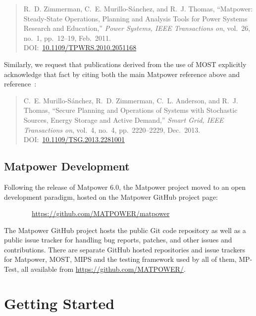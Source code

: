 \documentclass[12pt]{article}
\newcommand{\matpower}[0]{{\sc Matpower}}
\newcommand{\matpowergithuburl}[0]{https://github.com/MATPOWER/matpower}
\newcommand{\mptest}[0]{{MP-Test}}
\newcommand{\mips}[0]{{MIPS}}
\newcommand{\most}[0]{{MOST}}
\numberwithin{equation}{section}
\numberwithin{table}{section}
\numberwithin{figure}{section}
\begin{document}
\begin{quote}
\footnotesize
R.~D. Zimmerman, C.~E. Murillo-S{\'a}nchez, and R.~J. Thomas, ``\matpower{}: Steady-State Operations, Planning and Analysis Tools for Power Systems Research and Education,'' \emph{Power Systems, IEEE Transactions on}, vol.~26, no.~1, pp.~12--19, Feb.~2011.\\
DOI:~\href{https://doi.org/10.1109/TPWRS.2010.2051168}{10.1109/TPWRS.2010.2051168}
\end{quote}

Similarly, we request that publications derived from the use of \most{} explicitly acknowledge that fact by citing both the main \matpower{} reference above and reference~\cite{murillo-sanchez2013a}:

\begin{quote}
\footnotesize
C.~E. Murillo-S{\'a}nchez, R.~D. Zimmerman, C.~L. Anderson, and R.~J. Thomas, ``Secure Planning and Operations of Systems with Stochastic Sources, Energy Storage and Active Demand,'' \emph{Smart Grid, IEEE Transactions on}, vol.~4, no.~4, pp.~2220--2229, Dec.~2013.\\ DOI:~\href{https://doi.org/10.1109/TSG.2013.2281001}{10.1109/TSG.2013.2281001}
\end{quote}

\subsection{\matpower{} Development}
\label{sec:development}

Following the release of \matpower{} 6.0, the \matpower{} project moved to an open development paradigm, hosted on the \matpower{} GitHub project page:

\bigskip

~~~~~~~~\url{\matpowergithuburl}

\bigskip

The \matpower{} GitHub project hosts the public Git code repository as well as a public issue tracker for handling bug reports, patches, and other issues and contributions. There are separate GitHub hosted repositories and issue trackers for \matpower{}, \most{}, \mips{} and the testing framework used by all of them, \mptest{}, all available from \url{https://github.com/MATPOWER/}.


\clearpage
\section{Getting Started}
\end{document}
